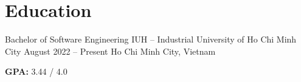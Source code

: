 \section{Education}

\resumeEntry
    {Bachelor of Software Engineering}
    {IUH -- Industrial University of Ho Chi Minh City}
    {August 2022 -- Present}
    {Ho Chi Minh City, Vietnam}

\begin{entryItems}
    \item \textbf{GPA:} 3.44 / 4.0
\end{entryItems}
